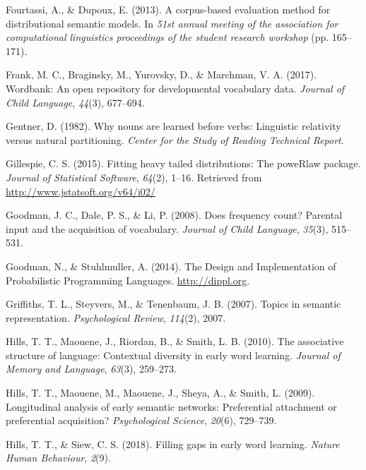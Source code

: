 \documentclass[english,,man,floatsintext]{apa6}
\begin{document}
\leavevmode\hypertarget{ref-fourtassi2013}{}%
Fourtassi, A., \& Dupoux, E. (2013). A corpus-based evaluation method for distributional semantic models. In \emph{51st annual meeting of the association for computational linguistics proceedings of the student research workshop} (pp. 165--171).

\leavevmode\hypertarget{ref-frank2017}{}%
Frank, M. C., Braginsky, M., Yurovsky, D., \& Marchman, V. A. (2017). Wordbank: An open repository for developmental vocabulary data. \emph{Journal of Child Language}, \emph{44}(3), 677--694.

\leavevmode\hypertarget{ref-gentner1982}{}%
Gentner, D. (1982). Why nouns are learned before verbs: Linguistic relativity versus natural partitioning. \emph{Center for the Study of Reading Technical Report}.

\leavevmode\hypertarget{ref-gillespie15}{}%
Gillespie, C. S. (2015). Fitting heavy tailed distributions: The poweRlaw package. \emph{Journal of Statistical Software}, \emph{64}(2), 1--16. Retrieved from \url{http://www.jstatsoft.org/v64/i02/}

\leavevmode\hypertarget{ref-goodman2008}{}%
Goodman, J. C., Dale, P. S., \& Li, P. (2008). Does frequency count? Parental input and the acquisition of vocabulary. \emph{Journal of Child Language}, \emph{35}(3), 515--531.

\leavevmode\hypertarget{ref-dippl}{}%
Goodman, N., \& Stuhlmuller, A. (2014). The Design and Implementation of Probabilistic Programming Languages. \url{http://dippl.org}.

\leavevmode\hypertarget{ref-griffiths07}{}%
Griffiths, T. L., Steyvers, M., \& Tenenbaum, J. B. (2007). Topics in semantic representation. \emph{Psychological Review}, \emph{114}(2), 2007.

\leavevmode\hypertarget{ref-hills2010}{}%
Hills, T. T., Maouene, J., Riordan, B., \& Smith, L. B. (2010). The associative structure of language: Contextual diversity in early word learning. \emph{Journal of Memory and Language}, \emph{63}(3), 259--273.

\leavevmode\hypertarget{ref-hills2009}{}%
Hills, T. T., Maouene, M., Maouene, J., Sheya, A., \& Smith, L. (2009). Longitudinal analysis of early semantic networks: Preferential attachment or preferential acquisition? \emph{Psychological Science}, \emph{20}(6), 729--739.

\leavevmode\hypertarget{ref-hills2018}{}%
Hills, T. T., \& Siew, C. S. (2018). Filling gaps in early word learning. \emph{Nature Human Behaviour}, \emph{2}(9).
\end{document}

